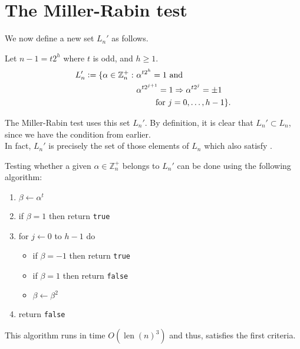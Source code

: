 \documentclass[12pt]{article}
\DeclareMathOperator{\len}{len}
\begin{document}
\section{The Miller-Rabin test}


    We now define a new set $L_{n}'$ as follows. 
    \begin{defn}
        Let $n - 1 = t 2^{h}$  where $t$ is odd, and $h \ge 1$. 
        \begin{align} 
            L_{n}' \vcentcolon= \{\alpha \in \mathbb{Z}_{n}^{+} :\ &\alpha^{t2^{h}} = 1 \text{ and} \nonumber \\
            & \alpha^{t2^{j + 1}} = 1 \Rightarrow \alpha^{t2^{j}} = \pm 1 \label{eq:sepia}\\
            & \qquad \text{ for } j = 0, \ldots, h - 1\}. \nonumber
        \end{align}
    \end{defn}
      
    The Miller-Rabin test uses this set $L_{n}'$.  By definition, it is clear that $L_{n}' \subset L_{n}$, since we have the condition  from earlier.  \\
    In fact, $L_{n}'$ is precisely the set of those elements of $L_{n}$ which also satisfy .



    Testing whether a given $\alpha \in \mathbb{Z}_{n}^{+}$ belongs to $L_{n}'$ can be done using the following algorithm: 
    \begin{algo} \phantom{hi} 
        \begin{enumerate}
            \itemsep1mm
            \item $\beta \leftarrow \alpha^{t}$
            \item if $\beta = 1$ then return \texttt{true}
            \item for $j \leftarrow 0$ to $h - 1$ do
            \begin{itemize}
                \item if $\beta = -1$ then return \texttt{true}
                \item if $\beta = 1$ then return \texttt{false}
                \item $\beta \leftarrow \beta^{2}$
            \end{itemize}
            \item return \texttt{false}
        \end{enumerate}
    \end{algo}
     This algorithm runs in time $O(\len(n)^{3})$ and thus, satisfies the first criteria.
\end{document}
